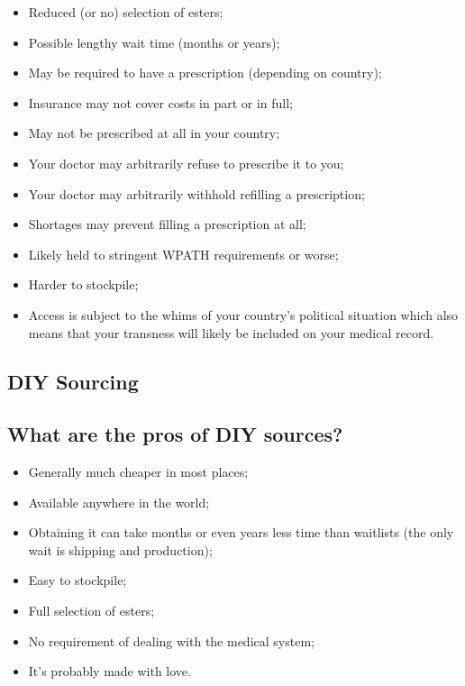 \documentclass{article}
\begin{document}
\begin{itemize}
  \item Reduced (or no) selection of esters;
  \item Possible lengthy wait time (months or years);
  \item May be required to have a prescription (depending on country);
  \item Insurance may not cover costs in part or in full;
  \item May not be prescribed at all in your country;
  \item Your doctor may arbitrarily refuse to prescribe it to you;
  \item Your doctor may arbitrarily withhold refilling a prescription;
  \item Shortages may prevent filling a prescription at all;
  \item Likely held to stringent WPATH requirements or worse;
  \item Harder to stockpile;
  \item Access is subject to the whims of your country’s political situation which also means that your transness will likely be included on your medical record.
\end{itemize}

\subsection*{DIY Sourcing}

\subsection{What are the pros of DIY sources?}

\begin{itemize}
\item Generally much cheaper in most places;
\item Available anywhere in the world;
\item Obtaining it can take months or even years less time than waitlists (the only wait is shipping and production);
\item Easy to stockpile;
\item Full selection of esters;
\item No requirement of dealing with the medical system;
\item It’s probably made with love.
\end{itemize}
\end{document}
